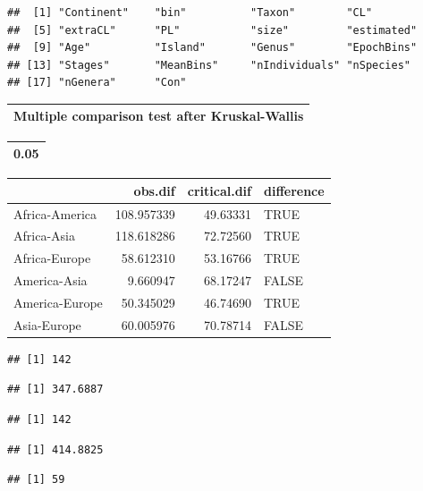 \documentclass[]{article}
\begin{document}
\begin{verbatim}
##  [1] "Continent"    "bin"          "Taxon"        "CL"          
##  [5] "extraCL"      "PL"           "size"         "estimated"   
##  [9] "Age"          "Island"       "Genus"        "EpochBins"   
## [13] "Stages"       "MeanBins"     "nIndividuals" "nSpecies"    
## [17] "nGenera"      "Con"
\end{verbatim}

\begin{table}

\centering
\begin{tabular}[t]{l}
\hline
Multiple comparison test after Kruskal-Wallis\\
\hline
\end{tabular}
\centering
\begin{tabular}[t]{r}
\hline
0.05\\
\hline
\end{tabular}
\centering
\begin{tabular}[t]{l|r|r|l}
\hline
  & obs.dif & critical.dif & difference\\
\hline
Africa-America & 108.957339 & 49.63331 & TRUE\\
\hline
Africa-Asia & 118.618286 & 72.72560 & TRUE\\
\hline
Africa-Europe & 58.612310 & 53.16766 & TRUE\\
\hline
America-Asia & 9.660947 & 68.17247 & FALSE\\
\hline
America-Europe & 50.345029 & 46.74690 & TRUE\\
\hline
Asia-Europe & 60.005976 & 70.78714 & FALSE\\
\hline
\end{tabular}
\end{table}

\begin{verbatim}
## [1] 142
\end{verbatim}

\begin{verbatim}
## [1] 347.6887
\end{verbatim}

\begin{verbatim}
## [1] 142
\end{verbatim}

\begin{verbatim}
## [1] 414.8825
\end{verbatim}

\begin{verbatim}
## [1] 59
\end{verbatim}
\end{document}
